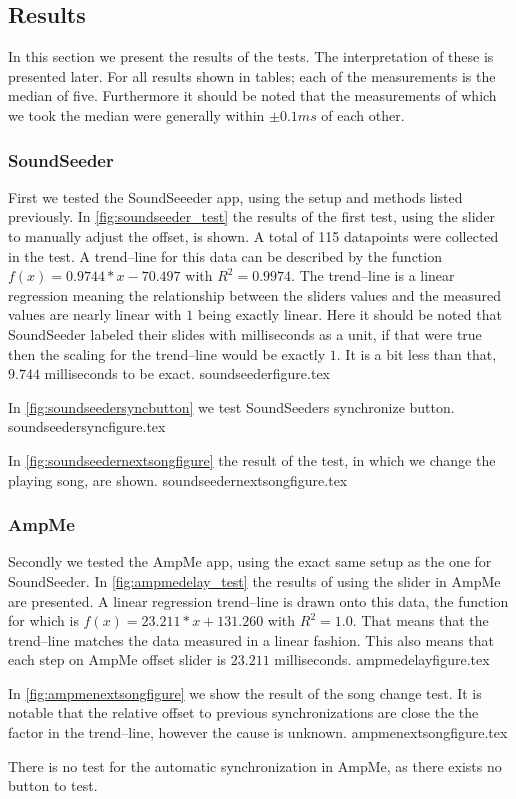 \subsection{Results}
In this section we present the results of the tests.
The interpretation of these is presented later.
For all results shown in tables; each of the measurements is the median of five. 
Furthermore it should be noted that the measurements of which we took the median were generally within $\pm 0.1 ms$ of each other. 

\subsubsection{SoundSeeder}
First we tested the SoundSeeeder app, using the setup and methods listed previously.
In \vref{fig:soundseeder_test} the results of the first test, using the slider to manually adjust the offset, is shown. 
A total of 115 datapoints were collected in the test.
A trend--line for this data can be described by the function $f(x) = 0.9744 * x - 70.497$ with $R^2=0.9974$.
The trend--line is a linear regression meaning the relationship between the sliders values and the measured values are nearly linear with $1$ being exactly linear.
Here it should be noted that SoundSeeder labeled their slides with milliseconds as a unit, if that were true then the scaling for the trend--line would be exactly $1$.
It is a bit less than that, $9.744$ milliseconds to be exact.
{soundseederfigure.tex}

In \vref{fig:soundseedersyncbutton} we test SoundSeeders synchronize button.
{soundseedersyncfigure.tex}

In \vref{fig:soundseedernextsongfigure} the result of the test, in which we change the playing song, are shown. 
{soundseedernextsongfigure.tex}

\subsubsection{AmpMe}
Secondly we tested the AmpMe app, using the exact same setup as the one for SoundSeeder. 
In \vref{fig:ampmedelay_test} the results of using the slider in AmpMe are presented.
A linear regression trend--line is drawn onto this data, the function for which is $f(x) = 23.211 * x + 131.260$ with $R^2 = 1.0$.
That means that the trend--line matches the data measured in a linear fashion. 
This also means that each step on AmpMe offset slider is $23.211$ milliseconds. 
{ampmedelayfigure.tex}

In \vref{fig:ampmenextsongfigure} we show the result of the song change test. 
It is notable that the relative offset to previous synchronizations are close the the factor in the trend--line, however the cause is unknown. 
{ampmenextsongfigure.tex}

There is no test for the automatic synchronization in AmpMe, as there exists no button to test. 

